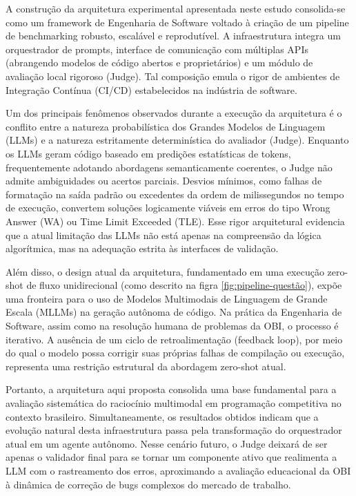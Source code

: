 \documentclass[sigconf,anonymous]{acmart} %
\begin{document}
A construção da arquitetura experimental apresentada neste estudo consolida-se como um framework de Engenharia de Software voltado à criação de um pipeline de benchmarking robusto, escalável e reprodutível. A infraestrutura integra um orquestrador de prompts, interface de comunicação com múltiplas APIs (abrangendo modelos de código abertos e proprietários) e um módulo de avaliação local rigoroso (Judge). Tal composição emula o rigor de ambientes de Integração Contínua (CI/CD) estabelecidos na indústria de software.

Um dos principais fenômenos observados durante a execução da arquitetura é o conflito entre a natureza probabilística dos Grandes Modelos de Linguagem (LLMs) e a natureza estritamente determinística do avaliador (Judge). Enquanto os LLMs geram código baseado em predições estatísticas de tokens, frequentemente adotando abordagens semanticamente coerentes, o Judge não admite ambiguidades ou acertos parciais. Desvios mínimos, como falhas de formatação na saída padrão ou excedentes da ordem de milissegundos no tempo de execução, convertem soluções logicamente viáveis em erros do tipo Wrong Answer (WA) ou Time Limit Exceeded (TLE). Esse rigor arquitetural evidencia que a atual limitação das LLMs não está apenas na compreensão da lógica algorítmica, mas na adequação estrita às interfaces de validação.

Além disso, o design atual da arquitetura, fundamentado em uma execução zero-shot de fluxo unidirecional (como descrito na figra \ref{fig:pipeline-questão}), expõe uma fronteira para o uso de Modelos Multimodais de Linguagem de Grande Escala (MLLMs) na geração autônoma de código. Na prática da Engenharia de Software, assim como na resolução humana de problemas da OBI, o processo é iterativo. A ausência de um ciclo de retroalimentação (feedback loop), por meio do qual o modelo possa corrigir suas próprias falhas de compilação ou execução, representa uma restrição estrutural da abordagem zero-shot atual.

Portanto, a arquitetura aqui proposta consolida uma base fundamental para a avaliação sistemática do raciocínio multimodal em programação competitiva no contexto brasileiro. Simultaneamente, os resultados obtidos indicam que a evolução natural desta infraestrutura passa pela transformação do orquestrador atual em um agente autônomo. Nesse cenário futuro, o Judge deixará de ser apenas o validador final para se tornar um componente ativo que realimenta a LLM com o rastreamento dos erros, aproximando a avaliação educacional da OBI à dinâmica de correção de bugs complexos do mercado de trabalho.
\end{document}
